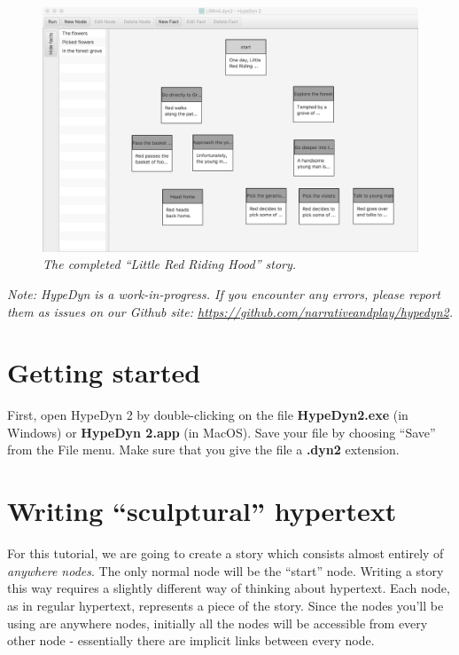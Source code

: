 \documentclass{article}
\begin{document}
\begin{figure}[h]
  \centering
  \includegraphics[width=12cm]{images/hypedyn-tutorial-3-figure-1}
  \caption{\textit{The completed ``Little Red Riding Hood'' story.}}
  \label{fig:tut3:completed}
\end{figure} 

\textit{Note:  HypeDyn is a work-in-progress. If you encounter any errors, please report them as issues on our Github site: \url{https://github.com/narrativeandplay/hypedyn2}.}

\section{Getting started}


First, open HypeDyn 2 by double-clicking on the file \textbf{HypeDyn2.exe} (in Windows) or \textbf{HypeDyn 2.app} (in MacOS). Save your file by choosing ``Save'' from the File menu. Make sure that you give the file a \textbf{.dyn2} extension.

\section{Writing ``sculptural'' hypertext}

For this tutorial, we are going to create a story which consists almost entirely of \textit{anywhere nodes}. The only normal node will be the ``start'' node. Writing a story this way requires a slightly different way of thinking about hypertext. Each node, as in regular hypertext, represents a piece of the story. Since the nodes you'll be using are anywhere nodes, initially all the nodes will be accessible from every other node - essentially there are implicit links between every node.
\end{document}
